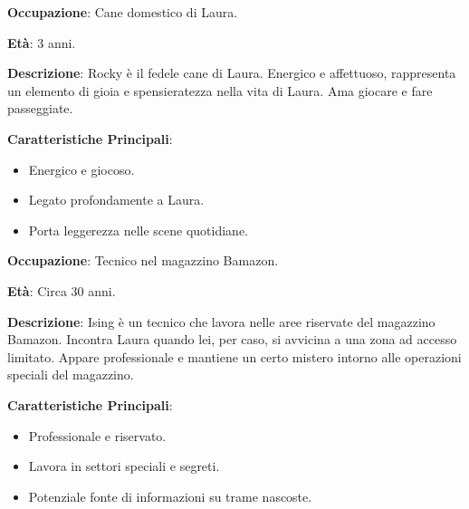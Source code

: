 \vspace{0.5cm}

\begin{tcolorbox}[colback=white,colframe=black,title=\textbf{Rocky}]
\begin{multicols}{2}
\textbf{Occupazione}: Cane domestico di Laura.

\textbf{Età}: 3 anni.

\textbf{Descrizione}: Rocky è il fedele cane di Laura. Energico e affettuoso, rappresenta un elemento di gioia e spensieratezza nella vita di Laura. Ama giocare e fare passeggiate.

\textbf{Caratteristiche Principali}:
\begin{itemize}
    \item Energico e giocoso.
    \item Legato profondamente a Laura.
    \item Porta leggerezza nelle scene quotidiane.
\end{itemize}
\end{multicols}
\end{tcolorbox}

\vspace{0.5cm}

\begin{tcolorbox}[colback=white,colframe=black,title=\textbf{Ising}]
\begin{multicols}{2}
\textbf{Occupazione}: Tecnico nel magazzino Bamazon.

\textbf{Età}: Circa 30 anni.

\textbf{Descrizione}: Ising è un tecnico che lavora nelle aree riservate del magazzino Bamazon. Incontra Laura quando lei, per caso, si avvicina a una zona ad accesso limitato. Appare professionale e mantiene un certo mistero intorno alle operazioni speciali del magazzino.

\textbf{Caratteristiche Principali}:
\begin{itemize}
    \item Professionale e riservato.
    \item Lavora in settori speciali e segreti.
    \item Potenziale fonte di informazioni su trame nascoste.
\end{itemize}
\end{multicols}
\end{tcolorbox}


\vspace{0.5cm}

